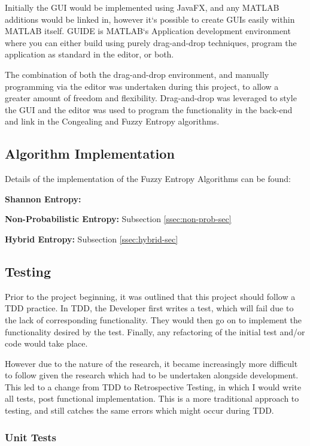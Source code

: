 Initially the \acrfull{GUI} would be implemented using JavaFX, and any MATLAB additions would be linked in, however it`s possible to create \acrshort{GUI}s easily within MATLAB itself. GUIDE \cite{guide} is MATLAB`s Application development environment where you can either build using purely drag-and-drop techniques, program the application as standard in the editor, or both.

The combination of both the drag-and-drop environment, and manually programming via the editor was undertaken during this project, to allow a greater amount of freedom and flexibility. Drag-and-drop was leveraged to style the \acrshort{GUI} and the editor was used to program the functionality in the back-end and link in the \Gls{Congealing} and Fuzzy Entropy algorithms.

\subsection{Algorithm Implementation}

Details of the implementation of the Fuzzy Entropy Algorithms can be found:

\textbf{Shannon Entropy: }

\textbf{Non-Probabilistic Entropy: } Subsection \ref{ssec:non-prob-sec}

\textbf{Hybrid Entropy: } Subsection \ref{ssec:hybrid-sec}

\subsection{Testing}

Prior to the project beginning, it was outlined that this project should follow a \acrshort{TDD} practice. In \acrshort{TDD}, the Developer first writes a test, which will fail due to the lack of corresponding functionality. They would then go on to implement the functionality desired by the test. Finally, any refactoring of the initial test and/or code would take place.

However due to the nature of the research, it became increasingly more difficult to follow given the research which had to be undertaken alongside development. This led to a change from \acrshort{TDD} to Retrospective Testing, in which I would write all tests, post functional implementation. This is a more traditional approach to testing, and still catches the same errors which might occur during \acrshort{TDD}.

\subsubsection{Unit Tests}

